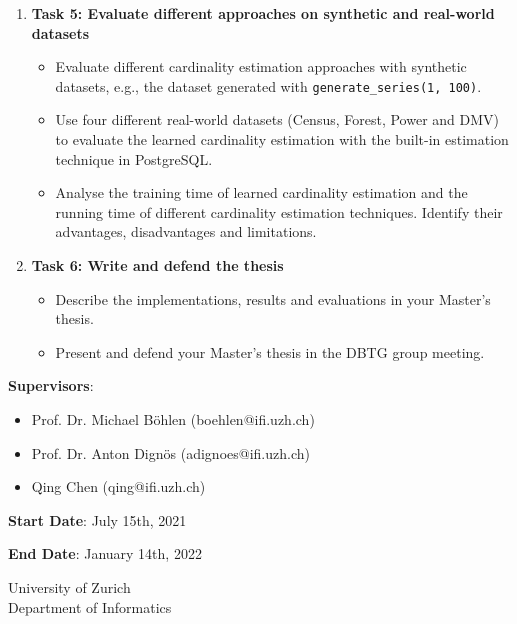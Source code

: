 \documentclass[english]{IFIletter}
\begin{document}
\begin{letter}
\begin{enumerate}
\item \textbf{Task 5: Evaluate different approaches on synthetic and
    real-world datasets}
  \begin{itemize}
  \item Evaluate different cardinality estimation approaches with
    synthetic datasets, e.g., the dataset generated with
    \texttt{generate\_series(1, 100)}.
  \item Use four different real-world datasets (Census, Forest, Power
    \cite{Dua:2019} and DMV\cite{NysTransport}) to evaluate the
    learned cardinality estimation with the built-in estimation
    technique in PostgreSQL.
  \item Analyse the training time of learned cardinality estimation
    and the running time of different cardinality estimation
    techniques. Identify their advantages, disadvantages and
    limitations.
  \end{itemize}

\item \textbf{Task 6: Write and defend the thesis}
  \begin{itemize}
  \item Describe the implementations, results and evaluations in your
    Master's thesis.
  \item Present and defend your Master's thesis in the DBTG group
    meeting.
  \end{itemize}
\end{enumerate}

\vspace{0.5cm}




\vspace{1cm}

\textbf{Supervisors}:
\begin{itemize}
\item Prof. Dr. Michael B\"ohlen (boehlen@ifi.uzh.ch)
\item Prof. Dr. Anton Dignös (adignoes@ifi.uzh.ch)
\item Qing Chen (qing@ifi.uzh.ch)
\end{itemize}

\vspace{0.5cm}
\textbf{Start Date}: July 15th, 2021

\vspace{0.5cm}
\textbf{End Date}: January 14th, 2022

\vspace{2cm}
\closing{University of Zurich\\Department of Informatics}

\end{letter}
\end{document}
